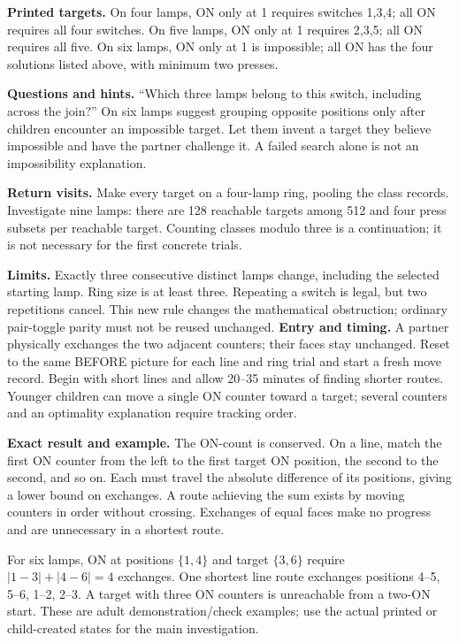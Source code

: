 \textbf{Printed targets.} On four lamps, ON only at 1 requires switches 1,3,4; all ON requires all four switches. On five lamps, ON only at 1 requires 2,3,5; all ON requires all five. On six lamps, ON only at 1 is impossible; all ON has the four solutions listed above, with minimum two presses.

\textbf{Questions and hints.} ``Which three lamps belong to this switch, including across the join?'' On six lamps suggest grouping opposite positions only after children encounter an impossible target. Let them invent a target they believe impossible and have the partner challenge it. A failed search alone is not an impossibility explanation.

\textbf{Return visits.} Make every target on a four-lamp ring, pooling the class records. Investigate nine lamps: there are 128 reachable targets among 512 and four press subsets per reachable target. Counting classes modulo three is a continuation; it is not necessary for the first concrete trials.

\textbf{Limits.} Exactly three consecutive distinct lamps change, including the selected starting lamp. Ring size is at least three. Repeating a switch is legal, but two repetitions cancel. This new rule changes the mathematical obstruction; ordinary pair-toggle parity must not be reused unchanged.
\newpage
{}
\textbf{Entry and timing.} A partner physically exchanges the two adjacent counters; their faces stay unchanged. Reset to the same BEFORE picture for each line and ring trial and start a fresh move record. Begin with short lines and allow 20--35 minutes of finding shorter routes. Younger children can move a single ON counter toward a target; several counters and an optimality explanation require tracking order.

\textbf{Exact result and example.} The ON-count is conserved. On a line, match the first ON counter from the left to the first target ON position, the second to the second, and so on. Each must travel the absolute difference of its positions, giving a lower bound on exchanges. A route achieving the sum exists by moving counters in order without crossing. Exchanges of equal faces make no progress and are unnecessary in a shortest route.

For six lamps, ON at positions $\{1,4\}$ and target $\{3,6\}$ require $|1-3|+|4-6|=4$ exchanges. One shortest line route exchanges positions 4--5, 5--6, 1--2, 2--3. A target with three ON counters is unreachable from a two-ON start. These are adult demonstration/check examples; use the actual printed or child-created states for the main investigation.

